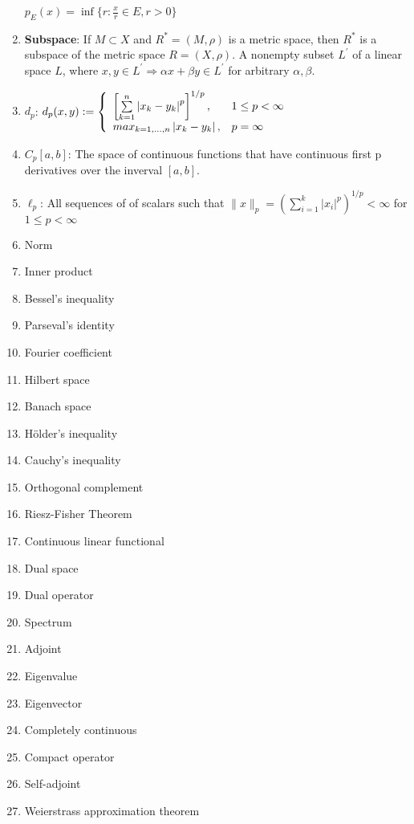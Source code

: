 \documentclass[12pt,letterpaper,reqno]{amsart}
\begin{document}
\begin{enumerate}[1.]
    $p_E(x) = \inf\{r: \frac{x}{r} \in E, r > 0\}$
\item \textbf{Subspace}: If $M \subset X$ and $R^* = (M, \rho)$ is a metric space, then $R^*$ is a subspace of the metric space $R = (X, \rho)$. A nonempty subset $L^\prime$ of a linear space $L$, where $x, y \in L^\prime \Rightarrow \alpha x + \beta y \in L^\prime$ for arbitrary $\alpha, \beta$.
\item $d_p$: $d _ { p } ( x , y ) : = \left\{ \begin{array} { l l } { \left[ \sum\limits_ { k = 1 } ^ { n } \left| x _ { k } - y _ { k } \right| ^ { p } \right] ^ { 1 / p } , } & { 1 \leq p < \infty } \\ { m a x _ { k = 1 , \ldots , n } \left| x _ { k } - y _ { k } \right| , } & { p = \infty } \end{array} \right.$
\item $C_p[a,b]$: The space of continuous functions that have continuous first p derivatives over the inverval $[a,b]$.
\item $\ell_p$: All sequences of of scalars such that $\| x \| _ { p } = \left( \sum\limits _ { i = 1 } ^ { k } \left| x _ { i } \right| ^ { p } \right) ^ { 1 / p } < \infty$ for $1 \leq p < \infty$
\item Norm
\item Inner product
\item Bessel's inequality
\item Parseval's identity
\item Fourier coefficient
\item Hilbert space
\item Banach space
\item H\"older's inequality
\item Cauchy's inequality
\item Orthogonal complement
\item Riesz-Fisher Theorem
\item Continuous linear functional
\item Dual space
\item Dual operator
\item Spectrum
\item Adjoint
\item Eigenvalue
\item Eigenvector
\item Completely continuous
\item Compact operator
\item Self-adjoint
\item Weierstrass approximation theorem
\end{enumerate}
\newpage
\end{document}

